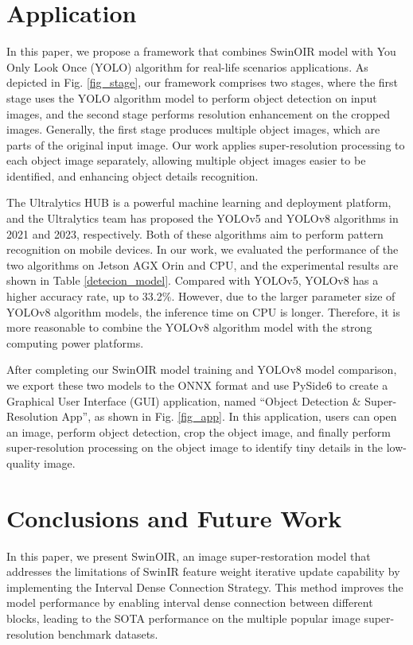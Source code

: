\documentclass[default,iicol]{sn-jnl}
\theoremstyle{thmstyleone}\newtheorem{theorem}{Theorem}\newtheorem{proposition}[theorem]{Proposition}
\theoremstyle{thmstyletwo}\newtheorem{example}{Example}\newtheorem{remark}{Remark}\theoremstyle{thmstylethree}\newtheorem{definition}{Definition}
\begin{document}
\section{Application}
\label{application}
In this paper, we propose a framework that combines SwinOIR model with You Only Look Once (YOLO) algorithm for real-life scenarios applications. As depicted in Fig. \ref{fig_stage}, our framework comprises two stages, where the first stage uses the YOLO algorithm model to perform object detection on input images, and the second stage performs resolution enhancement on the cropped images. Generally, the first stage produces multiple object images, which are parts of the original input image. Our work applies super-resolution processing to each object image separately, allowing multiple object images easier to be identified, and enhancing object details recognition.

The Ultralytics HUB is a powerful machine learning and deployment platform, and the Ultralytics team has proposed the YOLOv5 \cite{glenn2022} and YOLOv8 \cite{glenn2023} algorithms in 2021 and 2023, respectively. Both of these algorithms aim to perform pattern recognition on mobile devices. In our work, we evaluated the performance of the two algorithms on Jetson AGX Orin and CPU, and the experimental results are shown in Table \ref{detecion_model}. Compared with YOLOv5, YOLOv8 has a higher accuracy rate, up to 33.2\%. However, due to the larger parameter size of YOLOv8 algorithm models, the inference time on CPU is longer. Therefore, it is more reasonable to combine the YOLOv8 algorithm model with the strong computing power platforms.

After completing our SwinOIR model training and YOLOv8 model comparison, we export these two models to the ONNX format and use PySide6 to create a Graphical User Interface (GUI) application, named ``Object Detection \& Super-Resolution App'', as shown in Fig. \ref{fig_app}. In this application, users can open an image, perform object detection, crop the object image, and finally perform super-resolution processing on the object image to identify tiny details in the low-quality image.

\section{Conclusions and Future Work}
\label{conclusion}
In this paper, we present SwinOIR, an image super-restoration model that addresses the limitations of SwinIR feature weight iterative update capability by implementing the Interval Dense Connection Strategy. This method improves the model performance by enabling interval dense connection between different blocks, leading to the SOTA performance on the multiple popular image super-resolution benchmark datasets.
\end{document}
